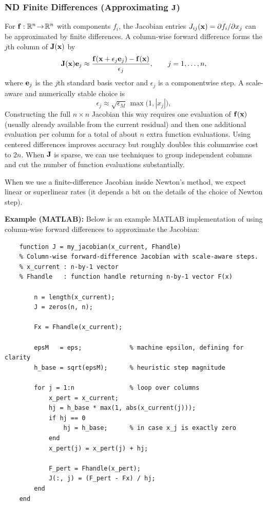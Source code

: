 \subsubsection{ND Finite Differences (Approximating \texorpdfstring{$\mathbf{J}$}{J})}
For $\mathbf{f}:\mathbb{R}^n\!\to\!\mathbb{R}^n$ with components $f_i$, the Jacobian entries $J_{ij}(\mathbf{x})=\partial f_i/\partial x_j$ can be approximated by finite differences. A column-wise forward difference forms the $j$th column of $\mathbf{J}(\mathbf{x})$ by
\begin{equation}
  \mathbf{J}(\mathbf{x})\mathbf{e}_j
  \approx
  \frac{\mathbf{f}(\mathbf{x}+\epsilon_j \mathbf{e}_j)-\mathbf{f}(\mathbf{x})}{\epsilon_j},
  \qquad j=1,\ldots,n,
\end{equation}
where $\mathbf{e}_j$ is the $j$th standard basis vector and $\epsilon_j$ is a componentwise step. A scale-aware and numerically stable choice is
\begin{equation}
  \epsilon_j \approx \sqrt{\epsilon_M}\,\max\!\bigl(1,|x_j|\bigr),
\end{equation}
Constructing the full $n\times n$ Jacobian this way requires one evaluation of $\mathbf{f}(\mathbf{x})$ (usually already available from the current residual) and then one additional evaluation per column for a total of about $n$ extra function evaluations. Using centered differences improves accuracy but roughly doubles this columnwise cost to $2n$. When $\mathbf{J}$ is sparse, we can use techniques to group independent columns and cut the number of function evaluations substantially.

When we use a finite-difference Jacobian inside Newton's method, we expect linear or superlinear rates (it depends a bit on the details of the choice of Newton step).

\begin{exampleBox}
    \textbf{Example (MATLAB):} Below is an example MATLAB implementation of using column-wise forward differences to approximate the Jacobian:
    \begin{verbatim}
    function J = my_jacobian(x_current, Fhandle)
    % Column-wise forward-difference Jacobian with scale-aware steps.
    % x_current : n-by-1 vector
    % Fhandle   : function handle returning n-by-1 vector F(x)

        n = length(x_current);
        J = zeros(n, n);

        Fx = Fhandle(x_current);

        epsM   = eps;             % machine epsilon, defining for clarity
        h_base = sqrt(epsM);      % heuristic step magnitude

        for j = 1:n               % loop over columns
            x_pert = x_current;
            hj = h_base * max(1, abs(x_current(j)));
            if hj == 0
                hj = h_base;      % in case x_j is exactly zero
            end
            x_pert(j) = x_pert(j) + hj;

            F_pert = Fhandle(x_pert);
            J(:, j) = (F_pert - Fx) / hj;
        end
    end
    \end{verbatim}
\end{exampleBox}

